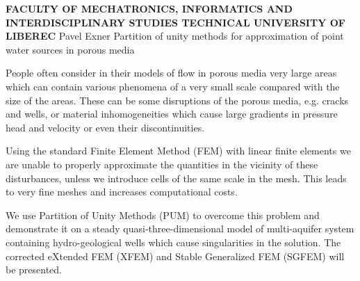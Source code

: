 \documentclass[a4paper,11pt]{article}
\begin{document}
{
\begin{center}
{\bf\MakeUppercase{Faculty of Mechatronics, Informatics and Interdisciplinary Studies \newline Technical University of Liberec}} \newline
Pavel Exner \newline
Partition of unity methods for approximation of point water sources in porous media
\end{center}
}

People often consider in their models of flow in porous media very large areas which can contain various phenomena of a very small scale
compared with the size of the areas. These can be some disruptions of the porous media, e.g. cracks and wells, or material inhomogeneities
which cause large gradients in pressure head and velocity or even their discontinuities.

Using the standard Finite Element Method (FEM) with linear finite elements we are unable to properly approximate the quantities in the vicinity of these 
disturbances, unless we introduce cells of the same scale in the mesh. This leads to very fine meshes and increases computational costs.

We use Partition of Unity Methods (PUM) to overcome this problem and demonstrate it on a steady quasi-three-dimensional model of multi-aquifer 
system containing hydro-geological wells which cause singularities in the solution. The corrected eXtended FEM (XFEM) 
and Stable Generalized FEM (SGFEM) will be presented.
\end{document}
